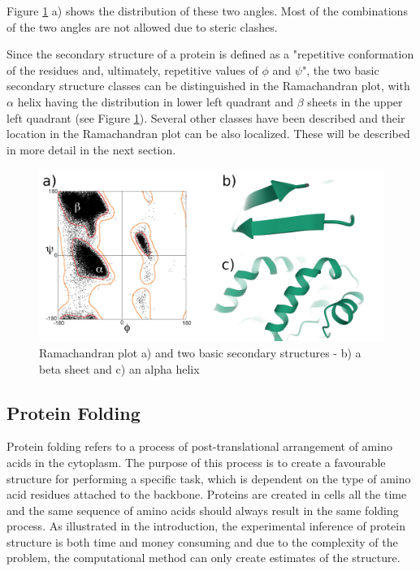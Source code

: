 Figure \ref{fig:ramachandran} a) shows the distribution of these two angles. 
Most of the combinations of the two angles are not allowed due to steric clashes. 

Since the secondary structure of a protein is defined as a "repetitive conformation of the residues and, ultimately, repetitive values of $\phi$ and $\psi$", the two basic secondary structure classes can be distinguished in the Ramachandran plot, with $\alpha$ helix having the distribution in lower left quadrant and $\beta$ sheets in the upper left quadrant (see Figure \ref{fig:ramachandran}). 
Several other classes have been described and their location in the Ramachandran plot can be also localized. These will be described in more detail in the next section. 

\begin{figure}
    \centering
    \includegraphics[width=\linewidth]{imgs_tomas/secondary.png}
    \caption{Ramachandran plot \cite{ramachandran} a) and two basic secondary structures - b) a beta sheet and c) an alpha helix \cite{pdb}}
    \label{fig:ramachandran}
\end{figure}

\subsection{Protein Folding}

Protein folding refers to a process of post-translational arrangement of amino acids in the cytoplasm. 
The purpose of this process is to create a favourable structure for performing a specific task, which is dependent on the type of amino acid residues attached to the backbone. 
Proteins are created in cells all the time and the same sequence of amino acids should always result in the same folding process. 
As illustrated in the introduction, the experimental inference of protein structure is both time and money consuming and due to the complexity of the problem, the computational method can only create estimates of the structure.

